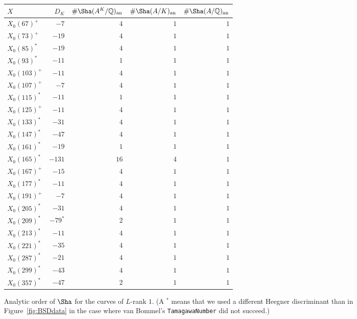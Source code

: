 \documentclass{amsart}
\newcommand{\Q}{{\mathbb{Q}}}
\newcommand{\an}{{\mathrm{an}}}
\begin{document}
	\begin{figure}[tbp]
		\begin{tabular}{lrrrr}
			\toprule
			$X$ & $D_K$ & $\#\Sha(A^K/\Q)_\an$ & $\#\Sha(A/K)_\an$ & $\#\Sha(A/\Q)_\an$\\
			\midrule
			$X_0(67)^+$		 & $ -7$   & $4$  & $1$ & $1$ \\
			$X_0(73)^+$      & $-19$   & $4$  & $1$ & $1$ \\
			$X_0(85)^*$      & $-19$   & $4$  & $1$ & $1$ \\
			$X_0(93)^*$      & $-11$   & $1$  & $1$ & $1$ \\
			$X_0(103)^+$     & $-11$   & $4$  & $1$ & $1$ \\
			$X_0(107)^+$     & $ -7$   & $4$  & $1$ & $1$ \\
			$X_0(115)^*$     & $-11$   & $1$  & $1$ & $1$ \\
			$X_0(125)^+$     & $-11$   & $4$  & $1$ & $1$ \\
			$X_0(133)^*$     & $-31$   & $4$  & $1$ & $1$ \\
			$X_0(147)^*$     & $-47$   & $4$  & $1$ & $1$ \\
			$X_0(161)^*$     & $-19$   & $1$  & $1$ & $1$ \\
			$X_0(165)^*$     &$-131$   & $16$ & $4$ & $1$ \\
			$X_0(167)^+$     & $-15$   & $4$  & $1$ & $1$ \\
			$X_0(177)^*$     & $-11$   & $4$  & $1$ & $1$ \\
			$X_0(191)^+$     & $ -7$   & $4$  & $1$ & $1$ \\
			$X_0(205)^*$     & $-31$   & $4$  & $1$ & $1$ \\
			$X_0(209)^*$     & $-79^*$ & $2$  & $1$ & $1$ \\
			$X_0(213)^*$     & $-11$   & $4$  & $1$ & $1$ \\
			$X_0(221)^*$     & $-35$   & $4$  & $1$ & $1$ \\
			$X_0(287)^*$     & $-21$   & $4$  & $1$ & $1$ \\
			$X_0(299)^*$     & $-43$   & $4$  & $1$ & $1$ \\
			$X_0(357)^*$     & $-47$   & $2$  & $1$ & $1$ \\
			\bottomrule
		\end{tabular}
		\caption{Analytic order of $\Sha$ for the curves of $L$-rank $1$. (A $^*$ means that we used a different Heegner discriminant than in Figure~\ref{fig:BSDdata} in the case where van Bommel's \texttt{TamagawaNumber} did not succeed.)}
		\label{fig:Sha_an}
	\end{figure}
	
\end{document}
